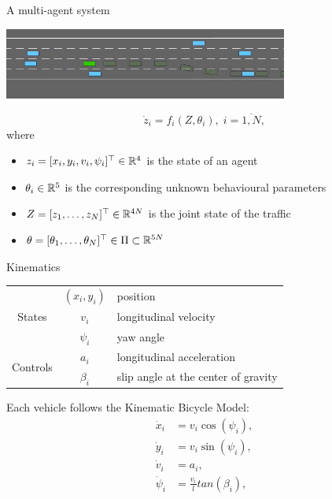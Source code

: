 \documentclass[slideopt,A4,showboxes,svgnames]{beamer}
\begin{document}
 \begin{frame}{A multi-agent system}
 
 \begin{center}
 \href{https://github.com/eleurent/highway-env\#highway}{
 \includegraphics[width=0.7\textwidth]{img/highway-env}}    
 \end{center}
 
 $$\dot{z}_i=f_i(Z,\theta_i),\;i=\overline{1,N},$$ where
 
 \begin{itemize}
 	\item $z_i = [x_i, y_i, v_i, \psi_i]^\top\in\mathbb{R}^4$ is the state of an agent
 	\item $\theta_i\in\mathbb{R}^5$ is the corresponding unknown behavioural parameters
 	\item $Z = [z_1,\dots,z_N]^\top\in\mathbb{R}^{4N}$  is the joint state of the traffic
 	\item $\theta=[\theta_1,\dots,\theta_N]^\top \in \Pi\subset\mathbb{R}^{5N}$	
 \end{itemize}
\end{frame}

\begin{frame}{Kinematics}
\begin{center}
\begin{tabular}{ccl}
    \toprule
    \multirow{3}{*}{States} & $(x_i, y_i)$ & position \\
    & $v_i$ & longitudinal velocity \\
    & $\psi_i$ & yaw angle \\
    \midrule
    \multirow{2}{*}{Controls} & $a_i$ & longitudinal acceleration \\
    & $\beta_i$ & slip angle at the center of gravity \\
    \bottomrule
\end{tabular}
\end{center}
Each vehicle follows the Kinematic Bicycle Model:
\begin{align}
	\dot{x}_i &= v_i\cos(\psi_i), \nonumber\\
	\dot{y}_i &= v_i\sin(\psi_i), \nonumber\\
	\dot{v}_i &= a_i, \nonumber\\
	\dot{\psi}_i &= \frac{v_i}{l}tan(\beta_i), \nonumber
\end{align}
\end{frame}
\end{document}
